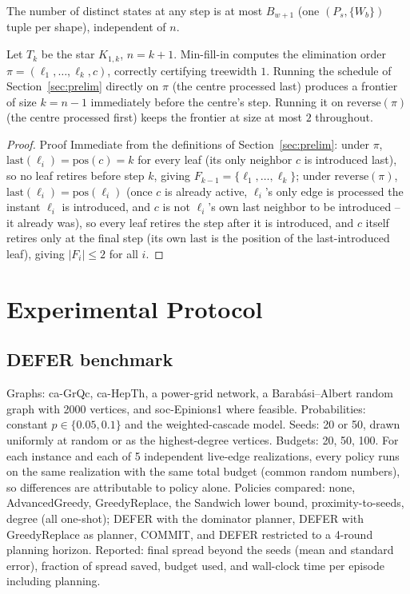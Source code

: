 \documentclass[ijoc,sglanonrev]{informs4}
\begin{document}
\begin{repeatproposition}
The number of distinct states at any step is at most $B_{w+1}$ (one
$(P_s,\{W_b\})$ tuple per shape), independent of $n$.
\end{repeatproposition}

\begin{repeatproposition}
Let $T_k$ be the star $K_{1,k}$, $n=k+1$. Min-fill-in computes the
elimination order $\pi=(\ell_1,\dots,\ell_k,c)$, correctly certifying
treewidth $1$. Running the schedule of Section~\ref{sec:prelim} directly on
$\pi$ (the centre processed last) produces a frontier of size $k=n-1$
immediately before the centre's step. Running it on $\mathrm{reverse}(\pi)$
(the centre processed first) keeps the frontier at size at most $2$
throughout.
\end{repeatproposition}
\begin{proof}{Proof}
Immediate from the definitions of Section~\ref{sec:prelim}: under $\pi$,
$\mathrm{last}(\ell_i)=\mathrm{pos}(c)=k$ for every leaf (its only neighbor
$c$ is introduced last), so no leaf retires before step $k$, giving
$F_{k-1}=\{\ell_1,\dots,\ell_k\}$; under $\mathrm{reverse}(\pi)$,
$\mathrm{last}(\ell_i)=\mathrm{pos}(\ell_i)$ (once $c$ is already active,
$\ell_i$'s only edge is processed the instant $\ell_i$ is introduced, and
$c$ is not $\ell_i$'s own last neighbor to be introduced -- it already was),
so every leaf retires the step after it is introduced, and $c$ itself
retires only at the final step (its own $\mathrm{last}$ is the position of
the last-introduced leaf), giving $|F_i|\le 2$ for all $i$.\Halmos
\end{proof}

\section{Experimental Protocol}\label{ec:reproducibility}

\subsection{DEFER benchmark}
Graphs: ca-GrQc, ca-HepTh, a power-grid network, a Barab\'asi--Albert
random graph with 2000 vertices, and soc-Epinions1 where feasible.
Probabilities: constant $p\in\{0.05,0.1\}$ and the weighted-cascade model.
Seeds: 20 or 50, drawn uniformly at random or as the highest-degree
vertices. Budgets: 20, 50, 100. For each instance and each of 5 independent
live-edge realizations, every policy runs on the same realization with the
same total budget (common random numbers), so differences are attributable
to policy alone. Policies compared: none, AdvancedGreedy, GreedyReplace,
the Sandwich lower bound, proximity-to-seeds, degree (all one-shot); DEFER
with the dominator planner, DEFER with GreedyReplace as planner, COMMIT,
and DEFER restricted to a 4-round planning horizon. Reported: final spread
beyond the seeds (mean and standard error), fraction of spread saved,
budget used, and wall-clock time per episode including planning.
\end{document}
